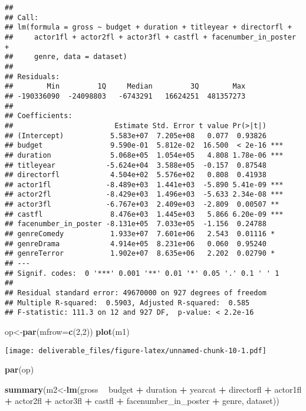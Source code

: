 \documentclass[]{article}
\newenvironment{Shaded}{\begin{snugshade}}{\end{snugshade}}
\newcommand{\KeywordTok}[1]{\textcolor[rgb]{0.13,0.29,0.53}{\textbf{#1}}}
\newcommand{\DataTypeTok}[1]{\textcolor[rgb]{0.13,0.29,0.53}{#1}}
\newcommand{\DecValTok}[1]{\textcolor[rgb]{0.00,0.00,0.81}{#1}}
\newcommand{\StringTok}[1]{\textcolor[rgb]{0.31,0.60,0.02}{#1}}
\newcommand{\OperatorTok}[1]{\textcolor[rgb]{0.81,0.36,0.00}{\textbf{#1}}}
\newcommand{\NormalTok}[1]{#1}
\begin{document}
\begin{verbatim}
## 
## Call:
## lm(formula = gross ~ budget + duration + titleyear + directorfl + 
##     actor1fl + actor2fl + actor3fl + castfl + facenumber_in_poster + 
##     genre, data = dataset)
## 
## Residuals:
##        Min         1Q     Median         3Q        Max 
## -190336090  -24098803   -6743291   16624251  481357273 
## 
## Coefficients:
##                        Estimate Std. Error t value Pr(>|t|)    
## (Intercept)           5.583e+07  7.205e+08   0.077  0.93826    
## budget                9.590e-01  5.812e-02  16.500  < 2e-16 ***
## duration              5.068e+05  1.054e+05   4.808 1.78e-06 ***
## titleyear            -5.624e+04  3.588e+05  -0.157  0.87548    
## directorfl            4.504e+02  5.576e+02   0.808  0.41938    
## actor1fl             -8.489e+03  1.441e+03  -5.890 5.41e-09 ***
## actor2fl             -8.429e+03  1.496e+03  -5.633 2.34e-08 ***
## actor3fl             -6.767e+03  2.409e+03  -2.809  0.00507 ** 
## castfl                8.476e+03  1.445e+03   5.866 6.20e-09 ***
## facenumber_in_poster -8.131e+05  7.033e+05  -1.156  0.24788    
## genreComedy           1.933e+07  7.601e+06   2.543  0.01116 *  
## genreDrama            4.914e+05  8.231e+06   0.060  0.95240    
## genreTerror           1.902e+07  8.635e+06   2.202  0.02790 *  
## ---
## Signif. codes:  0 '***' 0.001 '**' 0.01 '*' 0.05 '.' 0.1 ' ' 1
## 
## Residual standard error: 49670000 on 927 degrees of freedom
## Multiple R-squared:  0.5903, Adjusted R-squared:  0.585 
## F-statistic: 111.3 on 12 and 927 DF,  p-value: < 2.2e-16
\end{verbatim}

\begin{Shaded}
\begin{Highlighting}[]
\NormalTok{op<-}\KeywordTok{par}\NormalTok{(}\DataTypeTok{mfrow=}\KeywordTok{c}\NormalTok{(}\DecValTok{2}\NormalTok{,}\DecValTok{2}\NormalTok{))}
\KeywordTok{plot}\NormalTok{(m1)}
\end{Highlighting}
\end{Shaded}

\texttt{[image: deliverable\_files/figure-latex/unnamed-chunk-10-1.pdf]}

\begin{Shaded}
\begin{Highlighting}[]
\KeywordTok{par}\NormalTok{(op)}

\KeywordTok{summary}\NormalTok{(m2<-}\KeywordTok{lm}\NormalTok{(gross }\OperatorTok{~}\StringTok{ }\NormalTok{budget }\OperatorTok{+}\StringTok{ }\NormalTok{duration }\OperatorTok{+}\StringTok{ }\NormalTok{yearcat }\OperatorTok{+}\StringTok{ }\NormalTok{directorfl }\OperatorTok{+}\StringTok{ }\NormalTok{actor1fl }\OperatorTok{+}\StringTok{ }\NormalTok{actor2fl }\OperatorTok{+}\StringTok{ }\NormalTok{actor3fl }\OperatorTok{+}\StringTok{ }\NormalTok{castfl }\OperatorTok{+}\StringTok{ }\NormalTok{facenumber_in_poster }\OperatorTok{+}\StringTok{ }\NormalTok{genre, dataset))}
\end{Highlighting}
\end{Shaded}
\end{document}
